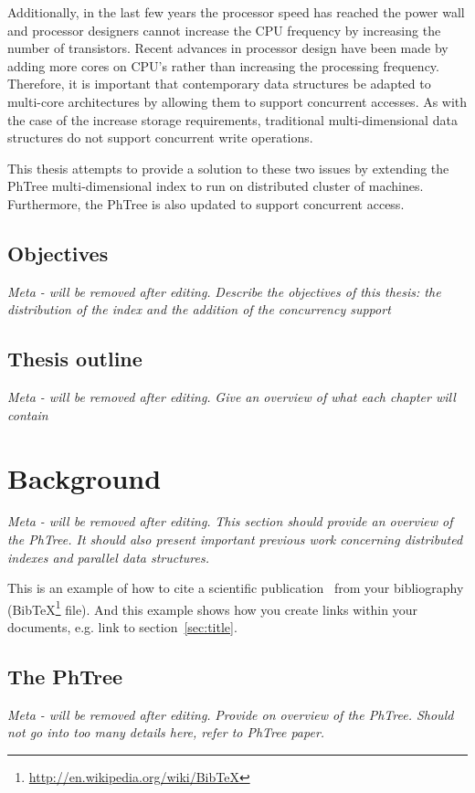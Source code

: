 \documentclass[11pt,a4paper]{globis-book}
\begin{document}
Additionally, in the last few years the processor speed has reached the power wall and processor designers cannot increase the CPU frequency by increasing the number of transistors. Recent advances in processor design have been made by adding more cores on CPU's rather than increasing the processing frequency. Therefore, it is important that contemporary data structures be adapted to multi-core architectures by allowing them to support concurrent accesses. As with the case of the increase storage requirements, traditional multi-dimensional data structures do not support concurrent write operations.

This thesis attempts to provide a solution to these two issues by extending the PhTree multi-dimensional index to run on distributed cluster of machines. Furthermore, the PhTree is also updated to support concurrent access.

\section{Objectives}

\textit{Meta - will be removed after editing.}
\textit{Describe the objectives of this thesis: the distribution of the index and the addition of the concurrency support}
\section{Thesis outline}
\label{sec:introduction-outline}
\textit{Meta - will be removed after editing.}
\textit{Give an overview of what each chapter will contain}
\label{sec:title}

\chapter{Background}
\textit{Meta - will be removed after editing.}
\textit{This section should provide an overview of the PhTree. It should also present important previous work concerning distributed indexes and parallel data structures.}

This is an example of how to cite a scientific publication~\cite{murolo2013} from your bibliography (BibTeX\footnote{\url{http://en.wikipedia.org/wiki/BibTeX}} file). And this example shows how you create links within your documents, e.g. link to section~\ref{sec:title}. 

\section{The PhTree}
\textit{Meta - will be removed after editing.}
\textit{Provide on overview of the PhTree. Should not go into too many details here, refer to PhTree paper.}
\end{document}
